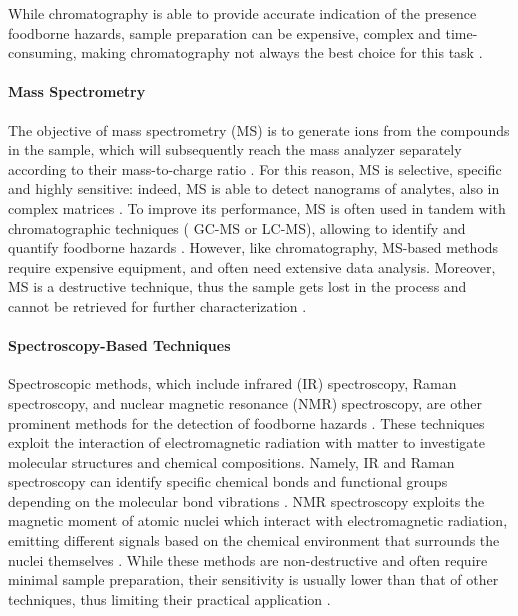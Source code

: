 While chromatography is able to provide accurate indication of the presence foodborne hazards, sample preparation can be expensive, complex and time-consuming, making chromatography not always the best choice for this task \citep{vuckovicCurrent2012,heDetection2021}.


\paragraph{Mass Spectrometry}
The objective of mass spectrometry (MS) is to generate ions from the compounds in the sample, which will subsequently reach the mass analyzer separately according to their mass-to-charge ratio \citep{franzenMassenspektrometrie1969}. For this reason, MS is selective, specific and highly sensitive: indeed, MS is able to detect nanograms of analytes, also in complex matrices \citep{nwachukwuRecent2024}. To improve its performance, MS is often used in tandem with chromatographic techniques (\ie{} GC-MS or LC-MS), allowing to identify and quantify foodborne hazards \citep{putriApplication2022,zhongUntargeted2022}. However, like chromatography, MS-based methods require expensive equipment, and often need extensive data analysis. Moreover, MS is a destructive technique, thus the sample gets lost in the process and cannot be retrieved for further characterization \citep{cortes-herreraLiquid2019,artaviaSelected2021}.

\paragraph{Spectroscopy-Based Techniques}
Spectroscopic methods, which include infrared (IR) spectroscopy, Raman spectroscopy, and nuclear magnetic resonance (NMR) spectroscopy, are other prominent methods for the detection of foodborne hazards \citep{heDetection2021}. These techniques exploit the interaction of electromagnetic radiation with matter to investigate molecular structures and chemical compositions. Namely, IR and Raman spectroscopy can identify specific chemical bonds and functional groups depending on the molecular bond vibrations \citep{quApplications2015,petersenApplication2021}.
NMR spectroscopy exploits the magnetic moment of atomic nuclei which interact with electromagnetic radiation, emitting different signals based on the chemical environment that surrounds the nuclei themselves \citep{hatzakisNuclear2019}. While these methods are non-destructive and often require minimal sample preparation, their sensitivity is usually lower than that of other techniques, thus limiting their practical application \citep{emwasStrengths2015}.

